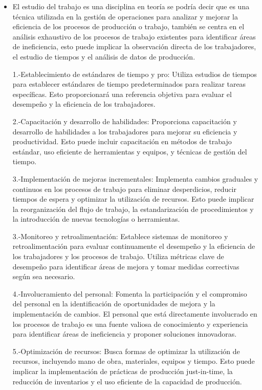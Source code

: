     \begin{itemize}
    \item 
    El estudio del trabajo es una disciplina en teoría se podría decir que es una técnica utilizada en la gestión de operaciones para analizar y mejorar la eficiencia de los procesos de producción o trabajo, también se centra en el análisis exhaustivo de los procesos de trabajo existentes para identificar áreas de ineficiencia, esto puede implicar la observación directa de los trabajadores, el estudio de tiempos y el análisis de datos de producción.
    
    1.-Establecimiento de estándares de tiempo y pro: Utiliza estudios de tiempos para establecer estándares de tiempo predeterminados para realizar tareas específicas. Esto proporcionará una referencia objetiva para evaluar el desempeño y la eficiencia de los trabajadores.
    
    2.-Capacitación y desarrollo de habilidades: Proporciona capacitación y desarrollo de habilidades a los trabajadores para mejorar su eficiencia y productividad. Esto puede incluir capacitación en métodos de trabajo estándar, uso eficiente de herramientas y equipos, y técnicas de gestión del tiempo.
    
    3.-Implementación de mejoras incrementales: Implementa cambios graduales y continuos en los procesos de trabajo para eliminar desperdicios, reducir tiempos de espera y optimizar la utilización de recursos. Esto puede implicar la reorganización del flujo de trabajo, la estandarización de procedimientos y la introducción de nuevas tecnologías o herramientas.
    
    3.-Monitoreo y retroalimentación: Establece sistemas de monitoreo y retroalimentación para evaluar continuamente el desempeño y la eficiencia de los trabajadores y los procesos de trabajo. Utiliza métricas clave de desempeño para identificar áreas de mejora y tomar medidas correctivas según sea necesario.
    
    4.-Involucramiento del personal: Fomenta la participación y el compromiso del personal en la identificación de oportunidades de mejora y la implementación de cambios. El personal que está directamente involucrado en los procesos de trabajo es una fuente valiosa de conocimiento y experiencia para identificar áreas de ineficiencia y proponer soluciones innovadoras.
    
    5.-Optimización de recursos: Busca formas de optimizar la utilización de recursos, incluyendo mano de obra, materiales, equipos y tiempo. Esto puede implicar la implementación de prácticas de producción just-in-time, la reducción de inventarios y el uso eficiente de la capacidad de producción.
    \end{itemize}
    
